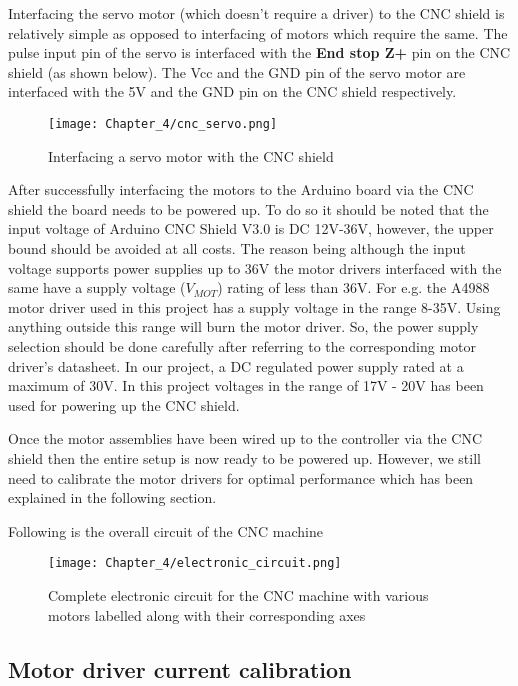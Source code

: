 Interfacing the servo motor (which doesn’t require a driver) to the CNC shield is relatively simple as opposed to interfacing of motors which require the same. The pulse input pin of the servo is interfaced with the \textbf{End stop Z+} pin on the CNC shield (as shown below). The Vcc and the GND pin of the servo motor are interfaced with the 5V and the GND pin on the CNC shield respectively. \par

\begin{figure}[h]
 \centering
 \texttt{[image: Chapter\_4/cnc\_servo.png]}
 \caption{Interfacing a servo motor with the CNC shield}
 \label{fig:cnc_servo}
\end{figure}

After successfully interfacing the motors to the Arduino board via the CNC shield the board needs to be powered up. To do so it should be noted that the input voltage of Arduino CNC Shield V3.0 is DC 12V-36V, however, the upper bound should be avoided at all costs. The reason being although the input voltage supports power supplies up to 36V the motor drivers interfaced with the same have a supply voltage ($V_{MOT}$) rating of less than 36V. For e.g. the A4988 motor driver used in this project has a supply voltage in the range 8-35V. Using anything outside this range will burn the motor driver. So, the power supply selection should be done carefully after referring to the corresponding motor driver’s datasheet. In our project, a DC regulated power supply rated at a maximum of 30V. In this project voltages in the range of 17V - 20V has been used for powering up the CNC shield. \par

Once the motor assemblies have been wired up to the controller via the CNC shield then the entire setup is now ready to be powered up. However, we still need to calibrate the motor drivers for optimal performance which has been explained in the following section.

Following is the overall circuit of the CNC machine

\begin{figure}[h]
 \centering
 \texttt{[image: Chapter\_4/electronic\_circuit.png]}
 \caption{Complete electronic circuit for the CNC machine with various motors labelled along with their corresponding axes}
 \label{fig:electronic_circuit}
\end{figure}


\subsection{Motor driver current calibration} \label{motor_calib}

